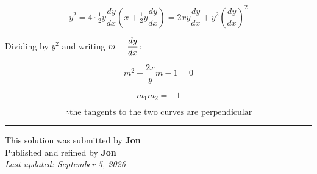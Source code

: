 \documentclass[12pt]{article}
\begin{document}
$$y^2=4\cdot\tfrac12y\frac{dy}{dx}\left(x+\tfrac12y\frac{dy}{dx}\right)=2xy\frac{dy}{dx}+y^2\left(\frac{dy}{dx}\right)^2$$

Dividing by $y^2$ and writing $\displaystyle m=\frac{dy}{dx}$:

$$m^2+\frac{2x}{y}m-1=0$$

$$m_1m_2=-1$$

$$\therefore \boxed{\text{the tangents to the two curves are perpendicular}}$$

\bigskip
\hrule
\begin{center}
    This solution was submitted by \textbf{Jon}\\[4pt]
    Published and refined by \textbf{Jon}\\[8pt]
    \textit{Last updated: September 5, 2026}
\end{center}
\end{document}
